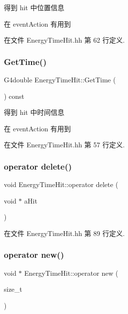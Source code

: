 得到 hit 中位置信息 

在 event\+Action 有用到 

在文件 Energy\+Time\+Hit.\+hh 第 62 行定义.

\mbox{\label{classEnergyTimeHit_ab7f49eaf401c5b559876d69330c57c78}} 
\subsubsection{\texorpdfstring{Get\+Time()}{GetTime()}}
{\footnotesize\ttfamily G4double Energy\+Time\+Hit\+::\+Get\+Time (\begin{DoxyParamCaption}{ }\end{DoxyParamCaption}) const\hspace{0.3cm}{\ttfamily [inline]}}



得到 hit 中时间信息 

在 event\+Action 有用到 

在文件 Energy\+Time\+Hit.\+hh 第 57 行定义.

\mbox{\label{classEnergyTimeHit_ab146f5c1aec4e913a416faee3b2ff60b}} 
\subsubsection{\texorpdfstring{operator delete()}{operator delete()}}
{\footnotesize\ttfamily void Energy\+Time\+Hit\+::operator delete (\begin{DoxyParamCaption}\item[{void $\ast$}]{a\+Hit }\end{DoxyParamCaption})\hspace{0.3cm}{\ttfamily [inline]}}



在文件 Energy\+Time\+Hit.\+hh 第 89 行定义.

\mbox{\label{classEnergyTimeHit_a13352f0fdc7bf25e3655b803b50ae9ca}} 
\subsubsection{\texorpdfstring{operator new()}{operator new()}}
{\footnotesize\ttfamily void $\ast$ Energy\+Time\+Hit\+::operator new (\begin{DoxyParamCaption}\item[{size\+\_\+t}]{ }\end{DoxyParamCaption})\hspace{0.3cm}{\ttfamily [inline]}}



